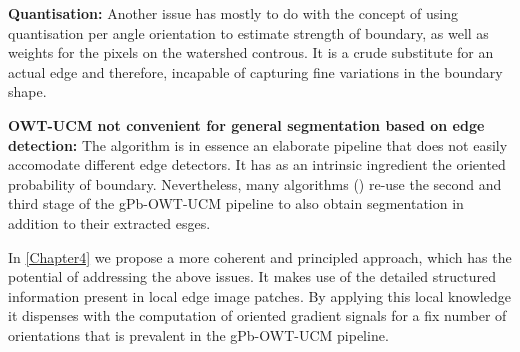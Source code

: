 \textbf{Quantisation:} Another issue has mostly to do with the concept of using quantisation per angle orientation to estimate strength of boundary, as well as weights for the pixels on the watershed controus. It is a crude substitute for an actual edge and therefore, incapable of capturing fine variations in the boundary shape.

\textbf{OWT-UCM not convenient for general segmentation based on edge detection:} The algorithm is in essence an elaborate pipeline that does not easily accomodate different edge detectors. It has as an intrinsic ingredient the oriented probability of boundary. Nevertheless, many algorithms (\eg \cite{Kisilev2013Learning,Arbelaez2014multiscale,Isola2014crisp,Hallman2014}) re-use the second and third stage of the gPb-OWT-UCM pipeline to also obtain segmentation in addition to their extracted esges.

In \cref{Chapter4} we propose a more coherent %
and principled approach, which has the potential of addressing the above issues. It makes use of the detailed structured information present in local edge image patches. By applying this local knowledge it dispenses with the computation of oriented gradient signals for a fix number of orientations that is prevalent in the gPb-OWT-UCM pipeline.
